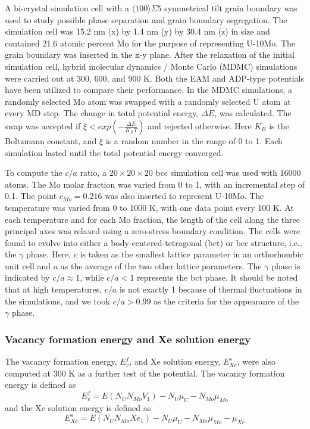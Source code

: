 \documentclass[review]{elsarticle}
\begin{document}
A bi-crystal simulation cell with a $\langle 100 \rangle \Sigma5$ symmetrical tilt grain boundary was used to study possible phase separation and grain boundary segregation. The simulation cell was 15.2 nm (x) by 1.4 nm (y) by 30.4 nm (z) in size and contained 21.6 atomic percent Mo for the purpose of representing U-10Mo. The grain boundary was inserted in the x-y plane. After the relaxation of the initial simulation cell, hybrid molecular dynamics / Monte Carlo (MDMC) simulations were carried out at 300, 600, and 900 K. Both the EAM and ADP-type potentials have been utilized to compare their performance. In the MDMC simulations, a randomly selected Mo atom was swapped with a randomly selected U atom at every MD step. The change in total potential energy, $\Delta E$, was calculated. The swap was accepted if $\xi<exp(-\frac{\Delta E}{K_BT})$ and rejected otherwise. Here $K_B$ is the Boltzmann constant, and $\xi$ is a random number in the range of 0 to 1. Each simulation lasted until the total potential energy converged. 

To compute the $c/a$ ratio, a $20\times20\times20$ bcc simulation cell was used with 16000 atoms. The Mo molar fraction was varied from 0 to 1, with an incremental step of 0.1. The point $c_{Mo}=0.216$ was also inserted to represent U-10Mo. The temperature was varied from 0 to 1000 K, with one data point every 100 K. At each temperature and for each Mo fraction, the length of the cell along the three principal axes was relaxed using a zero-stress boundary condition. The cells were found to evolve into either a body-centered-tetragonal (bct) or bcc structure, i.e., the $\gamma$ phase. Here, $c$ is taken as the smallest lattice parameter in an orthorhombic unit cell and $a$ as the average of the two other lattice parameters. The $\gamma$ phase is indicated by $c/a{\approx}1$, while $c/a<1$ represents the bct phase. It should be noted that at high temperatures, $c/a$ is not exactly 1 because of thermal fluctuations in the simulations, and we took $c/a>0.99$ as the criteria for the appearance of the $\gamma$ phase. 

\subsubsection{Vacancy formation energy and Xe solution energy}

The vacancy formation energy, $E^f_v$, and Xe solution energy, $E^s_{Xe}$, were also computed at 300 K as a further test of the potential. The vacancy formation energy is defined as
\begin{equation}\label{Efv}
E^f_v = E(N_U N_{Mo} V_1) - N_U \mu_U - N_{Mo} \mu_{Mo} 
\end{equation}
and the Xe solution energy is defined as 
 \begin{equation}\label{EfXe}
E^s_{Xe} = E(N_UN_{Mo}Xe_1)-N_U\mu_U-N_{Mo}\mu_{Mo}-\mu_{Xe} 
\end{equation}
\end{document}
